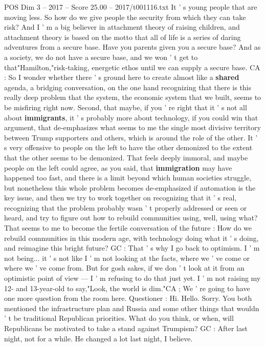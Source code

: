 \begin{textsample}{POS Dim 3 – 2017 – Score 25.00 – 2017/t001116.txt}
It ' s young people that are moving less.
So how do we give people the security from which they can take risk?
And I ' m a big believer in attachment theory of raising children, and attachment theory is based on the motto that all of life is a series of daring adventures from a secure base.
Have you parents given you a secure base?
And as a society, we do not have a secure base, and we won ' t get to that"Hamilton,"risk-taking, energetic ethos until we can supply a secure base.
CA : So I wonder whether there ' s ground here to create almost like a \textbf{shared} agenda, a bridging conversation, on the one hand recognizing that there is this really deep problem that the system, the economic system that we built, seems to be misfiring right now.
Second, that maybe, if you ' re right that it ' s not all about \textbf{immigrants}, it ' s probably more about technology, if you could win that argument, that de-emphasizes what seems to me the single most divisive territory between Trump supporters and others, which is around the role of the other.
It ' s very offensive to people on the left to have the other demonized to the extent that the other seems to be demonized.
That feels deeply immoral, and maybe people on the left could agree, as you said, that \textbf{immigration} may have happened too fast, and there is a limit beyond which human societies struggle, but nonetheless this whole problem becomes de-emphasized if automation is the key issue, and then we try to work together on recognizing that it ' s real, recognizing that the problem probably wasn ' t properly addressed or seen or heard, and try to figure out how to rebuild communities using, well, using what?
That seems to me to become the fertile conversation of the future : How do we rebuild communities in this modern age, with technology doing what it ' s doing, and reimagine this bright future?
GC : That ' s why I go back to optimism.
I ' m not being... it ' s not like I ' m not looking at the facts, where we ' ve come or where we ' ve come from.
But for gosh sakes, if we don ' t look at it from an optimistic point of view — I ' m refusing to do that just yet.
I ' m not raising my 12- and 13-year-old to say,"Look, the world is dim."CA ; We ' re going to have one more question from the room here.
Questioner : Hi.
Hello.
Sorry.
You both mentioned the infrastructure plan and Russia and some other things that wouldn ' t be traditional Republican priorities.
What do you think, or when, will Republicans be motivated to take a stand against Trumpism?
GC : After last night, not for a while.
He changed a lot last night, I believe.

\end{textsample}
